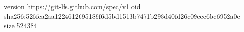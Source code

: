 version https://git-lfs.github.com/spec/v1
oid sha256:526fea2aa1224612695189f6d5bd1513b7471b298d40fd26c09cec6bc6952a0e
size 524384
